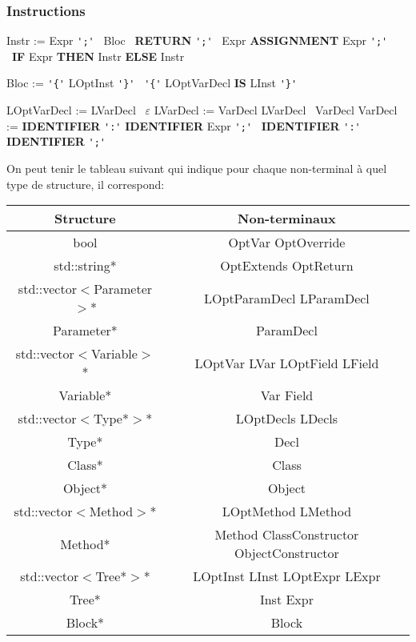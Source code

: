 \documentclass[12pt,a4paper]{article}
\begin{document}
\subsubsection{Instructions}

{\sffamily
Instr := Expr \verb|';'| \newline
\hspace*{1em} \textbar \ Bloc \newline
\hspace*{1em} \textbar \ \textbf{RETURN} \verb|';'| \newline
\hspace*{1em} \textbar \ Expr \textbf{ASSIGNMENT} Expr \verb|';'| \newline
\hspace*{1em} \textbar \ \textbf{IF} Expr \textbf{THEN} Instr \textbf{ELSE} Instr
}

{\sffamily
Bloc  := \verb|'{'| LOptInst \verb|'}'| \textbar \ \verb|'{'| LOptVarDecl \textbf{IS} LInst \verb|'}'|

LOptVarDecl := LVarDecl \textbar \ $\varepsilon$ \newline
LVarDecl := VarDecl LVarDecl \textbar \ VarDecl \newline
VarDecl := \textbf{IDENTIFIER} \verb|':'| \textbf{IDENTIFIER} Expr \verb|';'| \newline
\hspace*{1em} \textbar \ \textbf{IDENTIFIER} \verb|':'| \textbf{IDENTIFIER} \verb|';'| \newline
}

\newpage

On peut tenir le tableau suivant qui indique pour chaque non-terminal à quel type de structure, il correspond:

\begin{center}
	\sffamily
	\begin{tabular}{|c|c|}
		\hline
		Structure & Non-terminaux \tabularnewline
		\hline \hline
		{\color{blue}bool} & OptVar OptOverride \tabularnewline
		\hline
		{\color{turquoise}std}::{\color{turquoise}string}* & OptExtends OptReturn \tabularnewline
		\hline
		{\color{turquoise}std}::{\color{turquoise}vector}$<$Parameter$>$* & LOptParamDecl LParamDecl \tabularnewline
		\hline
		Parameter* & ParamDecl \tabularnewline
		\hline
		{\color{turquoise}std}::{\color{turquoise}vector}$<$Variable$>$* & LOptVar LVar LOptField LField \tabularnewline
		\hline
		Variable* & Var Field \tabularnewline
		\hline
		{\color{turquoise}std}::{\color{turquoise}vector}$<$Type*$>$* & LOptDecls LDecls \tabularnewline
		\hline
		Type* & Decl \tabularnewline
		\hline
		Class* & Class \tabularnewline
		\hline
		Object* & Object \tabularnewline
		\hline
		{\color{turquoise}std}::{\color{turquoise}vector}$<$Method$>$* & LOptMethod LMethod \tabularnewline
		\hline
		Method* & Method ClassConstructor ObjectConstructor \tabularnewline
		\hline
		{\color{turquoise}std}::{\color{turquoise}vector}$<$Tree*$>$* & LOptInst LInst LOptExpr LExpr\tabularnewline
		\hline
		Tree* & Inst Expr \tabularnewline
		\hline
		Block* & Block \tabularnewline
		\hline
	\end{tabular}
\end{center}
\end{document}
